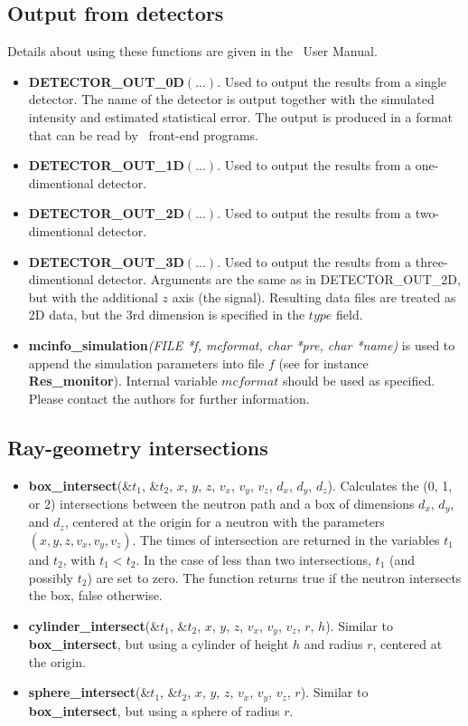 \subsection{Output from detectors}
Details about using these functions are given in the \MCS\ User Manual.
\begin{itemize}
\item {\bf DETECTOR\_OUT\_0D}$(...)$. Used to output the results from a
  single detector. The name of the detector is output together
  with the simulated intensity and estimated statistical error. The
  output is produced in a format that can be read by \MCS\ front-end
  programs.
\item {\bf DETECTOR\_OUT\_1D}$(...)$. Used to output the results from a
  one-dimentional detector.
\item {\bf DETECTOR\_OUT\_2D}$(...)$. Used to output the results from a
  two-dimentional detector.
\item {\bf DETECTOR\_OUT\_3D}$(...)$. Used to output
  the results from a three-dimentional detector. Arguments are the same as
  in DETECTOR\_OUT\_2D, but with the additional $z$ axis (the signal).
  Resulting data files are treated as 2D data, but the 3rd dimension is
  specified in the $type$ field.
\item {\bf mcinfo\_simulation}{\it (FILE *f, mcformat,
  char *pre, char *name)} is used to append the simulation parameters into file $f$
  (see for instance {\bf Res\_monitor}).
  Internal variable $mcformat$ should be used as specified.
  Please contact the authors for further information.
\end{itemize}

\subsection{Ray-geometry intersections}
\begin{itemize}
\item {\bf box\_intersect}(\&$t_1$, \&$t_2$, $x$, $y$, $z$, $v_x$, $v_y$, $v_z$,
  $d_x$, $d_y$, $d_z$). Calculates the (0, 1, or 2) intersections between
  the neutron path and a box of dimensions $d_x$, $d_y$, and $d_z$,
  centered at the origin for a neutron with the parameters
  $(x,y,z,v_x,v_y,v_z)$. The times of intersection are returned
  in the variables $t_1$ and $t_2$, with $t_1 < t_2$. In the case
  of less than two intersections, $t_1$ (and possibly $t_2$) are set to
  zero. The function returns true if the neutron intersects the box,
  false otherwise.
\item {\bf cylinder\_intersect}(\&$t_1$, \&$t_2$, $x$, $y$, $z$, $v_x$, $v_y$, $v_z$,
  $r$, $h$).  Similar to {\bf box\_intersect}, but using a cylinder of height $h$ and radius $r$,
  centered at the origin.
\item {\bf sphere\_intersect}(\&$t_1$, \&$t_2$, $x$, $y$, $z$, $v_x$, $v_y$, $v_z$,
  $r$). Similar to {\bf box\_intersect}, but using a sphere
  of radius $r$.
\end{itemize}

